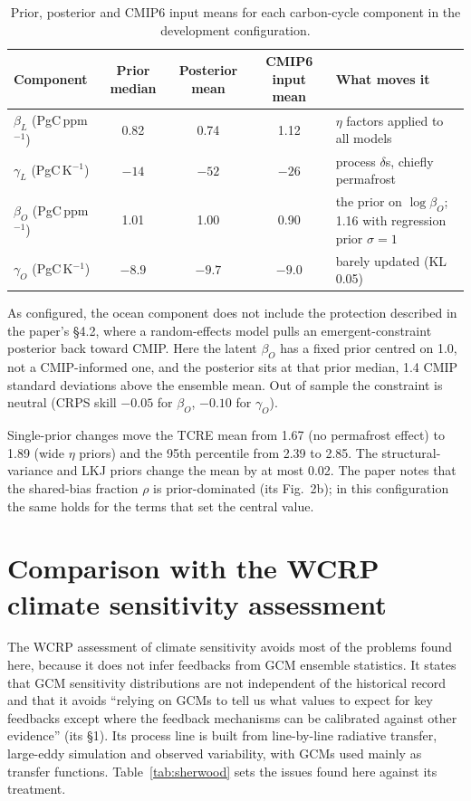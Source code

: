 \documentclass[11pt,a4paper]{article}
\newcommand{\Pgk}{PgC\,K$^{-1}$}
\newcommand{\Pgp}{PgC\,ppm$^{-1}$}
\newcommand{\bL}{$\beta_L$}
\newcommand{\gL}{$\gamma_L$}
\newcommand{\bO}{$\beta_O$}
\newcommand{\gO}{$\gamma_O$}
\begin{document}
\begin{table}[ht]
\centering\small
\caption{Prior, posterior and CMIP6 input means for each carbon-cycle component in the development configuration.}
\label{tab:components}
\begin{tabularx}{\textwidth}{lcccL}
\toprule
Component & Prior median & Posterior mean & CMIP6 input mean & What moves it \\
\midrule
\bL{} (\Pgp) & 0.82 & 0.74 & 1.12 & $\eta$ factors applied to all models \\
\gL{} (\Pgk) & $-14$ & $-52$ & $-26$ & process $\delta$s, chiefly permafrost \\
\bO{} (\Pgp) & 1.01 & 1.00 & 0.90 & the prior on $\log\beta_O$; 1.16 with regression prior $\sigma = 1$ \\
\gO{} (\Pgk) & $-8.9$ & $-9.7$ & $-9.0$ & barely updated (KL 0.05) \\
\bottomrule
\end{tabularx}
\end{table}

As configured, the ocean component does not include the protection described in the paper's \S4.2, where a random-effects model pulls an emergent-constraint posterior back toward CMIP. Here the latent \bO{} has a fixed prior centred on 1.0, not a CMIP-informed one, and the posterior sits at that prior median, 1.4 CMIP standard deviations above the ensemble mean. Out of sample the constraint is neutral (CRPS skill $-0.05$ for \bO, $-0.10$ for \gO).

Single-prior changes move the TCRE mean from 1.67 (no permafrost effect) to 1.89 (wide $\eta$ priors) and the 95th percentile from 2.39 to 2.85. The structural-variance and LKJ priors change the mean by at most 0.02. The paper notes that the shared-bias fraction $\rho$ is prior-dominated (its Fig.~2b); in this configuration the same holds for the terms that set the central value.

\section{Comparison with the WCRP climate sensitivity assessment}
\label{sec:sherwood}

The WCRP assessment of climate sensitivity \citep{sherwood2020} avoids most of the problems found here, because it does not infer feedbacks from GCM ensemble statistics. It states that GCM sensitivity distributions are not independent of the historical record and that it avoids ``relying on GCMs to tell us what values to expect for key feedbacks except where the feedback mechanisms can be calibrated against other evidence'' (its \S1). Its process line is built from line-by-line radiative transfer, large-eddy simulation and observed variability, with GCMs used mainly as transfer functions. Table~\ref{tab:sherwood} sets the issues found here against its treatment.
\end{document}
